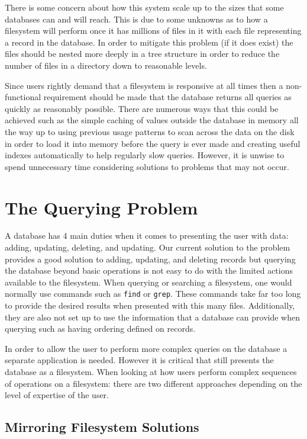 There is some concern about how this system scale up to the sizes that some
databases can and will reach. This is due to some unknowns as to how
a filesystem will perform once it has millions of files in it with each file
representing a record in the database. In order to mitigate this problem (if it
does exist) the files should be nested more deeply in a tree structure in order
to reduce the number of files in a directory down to reasonable levels.

Since users rightly demand that a filesystem is responsive at all times then
a non-functional requirement should be made that the database returns all
queries as quickly as reasonably possible. There are numerous ways that this
could be achieved such as the simple caching of values outside the database in
memory all the way up to using previous usage patterns to scan across the data
on the disk in order to load it into memory before the query is ever made and
creating useful indexes automatically to help regularly slow queries. However,
it is unwise to spend unnecessary time considering solutions to problems that
may not occur.

\section{The Querying Problem}
\label{sec:queryproblem}

A database has 4 main duties when it comes to presenting the user with data:
adding, updating, deleting, and updating. Our current solution to the problem
provides a good solution to adding, updating, and deleting records but querying
the database beyond basic operations is not easy to do with the limited actions
available to the filesystem. When querying or searching a filesystem, one would
normally use commands such as \texttt{find} or \texttt{grep}. These commands
take far too long to provide the desired results when presented with this many
files. Additionally, they are also not set up to use the information that
a database can provide when querying such as having ordering defined on
records.

In order to allow the user to perform more complex queries on the database
a separate application is needed. However it is critical that still presents
the database as a filesystem. When looking at how users perform complex
sequences of operations on a filesystem: there are two different approaches
depending on the level of expertise of the user.

\subsection{Mirroring Filesystem Solutions}

